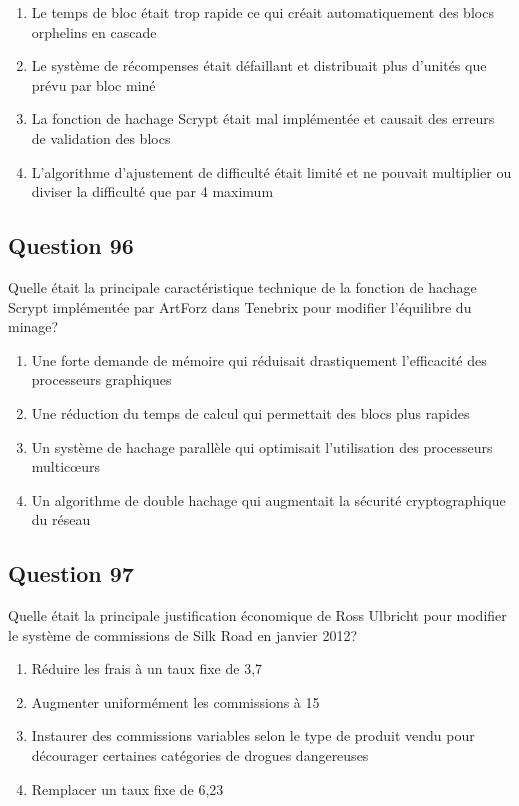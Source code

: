 \documentclass[12pt,a4paper]{article}
\begin{document}
\begin{enumerate}[label=\Alph*., leftmargin=*]
\item Le temps de bloc était trop rapide ce qui créait automatiquement des blocs orphelins en cascade
\item Le système de récompenses était défaillant et distribuait plus d'unités que prévu par bloc miné
\item La fonction de hachage Scrypt était mal implémentée et causait des erreurs de validation des blocs
\item L'algorithme d'ajustement de difficulté était limité et ne pouvait multiplier ou diviser la difficulté que par 4 maximum
\end{enumerate}

\bigskip


\subsection*{Question 96}
Quelle était la principale caractéristique technique de la fonction de hachage Scrypt implémentée par ArtForz dans Tenebrix pour modifier l'équilibre du minage?

\begin{enumerate}[label=\Alph*., leftmargin=*]
\item Une forte demande de mémoire qui réduisait drastiquement l'efficacité des processeurs graphiques
\item Une réduction du temps de calcul qui permettait des blocs plus rapides
\item Un système de hachage parallèle qui optimisait l'utilisation des processeurs multicœurs
\item Un algorithme de double hachage qui augmentait la sécurité cryptographique du réseau
\end{enumerate}

\bigskip


\subsection*{Question 97}
Quelle était la principale justification économique de Ross Ulbricht pour modifier le système de commissions de Silk Road en janvier 2012?

\begin{enumerate}[label=\Alph*., leftmargin=*]
\item Réduire les frais à un taux fixe de 3,7%
\item Augmenter uniformément les commissions à 15%
\item Instaurer des commissions variables selon le type de produit vendu pour décourager certaines catégories de drogues dangereuses
\item Remplacer un taux fixe de 6,23%
\end{enumerate}
\end{document}
